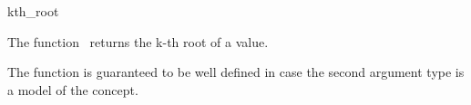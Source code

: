 \begin{ccRefFunction}{kth_root}

\ccDefinition

The function \ccRefName\ returns the k-th root of a value.

The function is guaranteed to be well defined in case the second argument type 
is a model of the  concept. 


{}


\ccSeeAlso

\\
\\


\end{ccRefFunction}
